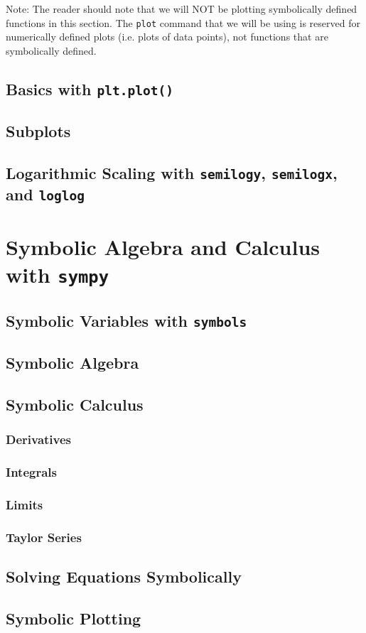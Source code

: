 Note: The reader should note that we will NOT be plotting symbolically defined functions
in this section.  The \texttt{plot} command that we will be using is reserved for numerically
defined plots (i.e. plots of data points), not functions that are symbolically defined.


\subsection{Basics with \texttt{plt.plot()}}

\subsection{Subplots}

\subsection{Logarithmic Scaling with \texttt{semilogy}, \texttt{semilogx}, and
\texttt{loglog}}


\section{Symbolic Algebra and Calculus with \texttt{sympy}}

\subsection{Symbolic Variables with \texttt{symbols}}

\subsection{Symbolic Algebra}


\subsection{Symbolic Calculus}

\subsubsection{Derivatives}

\subsubsection{Integrals}

\subsubsection{Limits}

\subsubsection{Taylor Series}

\subsection{Solving Equations Symbolically}

\subsection{Symbolic Plotting}




